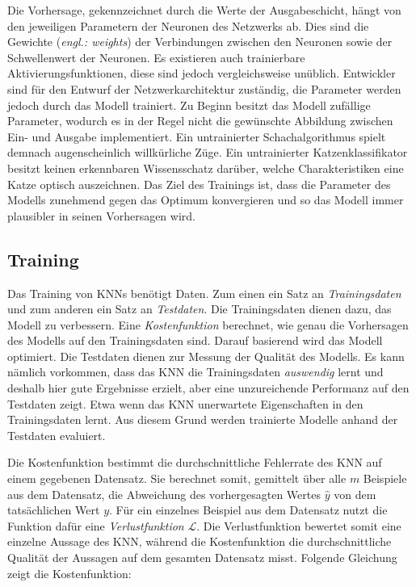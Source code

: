 Die Vorhersage, gekennzeichnet durch die Werte der Ausgabeschicht, hängt von den jeweiligen Parametern der Neuronen des Netzwerks ab. Dies sind die Gewichte (\emph{engl.: weights}) der Verbindungen zwischen den Neuronen sowie der Schwellenwert der Neuronen. Es existieren auch trainierbare Aktivierungsfunktionen, diese sind jedoch vergleichsweise unüblich. Entwickler sind für den Entwurf der Netzwerkarchitektur zuständig, die Parameter werden jedoch durch das Modell trainiert. Zu Beginn besitzt das Modell zufällige Parameter, wodurch es in der Regel nicht die gewünschte Abbildung zwischen Ein- und Ausgabe implementiert. Ein untrainierter Schachalgorithmus spielt demnach augenscheinlich willkürliche Züge. Ein untrainierter Katzenklassifikator besitzt keinen erkennbaren Wissensschatz darüber, welche Charakteristiken eine Katze optisch auszeichnen. Das Ziel des Trainings ist, dass die Parameter des Modells zunehmend gegen das Optimum konvergieren und so das Modell immer plausibler in seinen Vorhersagen wird. \cite{knnsKompakt} \cite{visualApproach}

\subsection{Training}
Das Training von \acp{KNN} benötigt Daten. Zum einen ein Satz an \emph{Trainingsdaten} und zum anderen ein Satz an \emph{Testdaten}. Die Trainingsdaten dienen dazu, das Modell zu verbessern. Eine \emph{Kostenfunktion} berechnet, wie genau die Vorhersagen des Modells auf den Trainingsdaten sind. Darauf basierend wird das Modell optimiert. Die Testdaten dienen zur Messung der Qualität des Modells. Es kann nämlich vorkommen, dass das \ac{KNN} die Trainingsdaten \emph{auswendig} lernt und deshalb hier gute Ergebnisse erzielt, aber eine unzureichende Performanz auf den Testdaten zeigt. Etwa wenn das \ac{KNN} unerwartete Eigenschaften in den Trainingsdaten lernt. Aus diesem Grund werden trainierte Modelle anhand der Testdaten evaluiert. \cite{knnsKompakt}

Die Kostenfunktion bestimmt die durchschnittliche Fehlerrate des \ac{KNN} auf einem gegebenen Datensatz. Sie berechnet somit, gemittelt über alle $m$ Beispiele aus dem Datensatz, die Abweichung des vorhergesagten Wertes $\hat{y}$ von dem tatsächlichen Wert $y$. Für ein einzelnes Beispiel aus dem Datensatz nutzt die Funktion dafür eine \emph{Verlustfunktion} $\mathcal{L}$. Die Verlustfunktion bewertet somit eine einzelne Aussage des \ac{KNN}, während die Kostenfunktion die durchschnittliche Qualität der Aussagen auf dem gesamten Datensatz misst. Folgende Gleichung zeigt die Kostenfunktion: \cite{DeepLearningBook}

